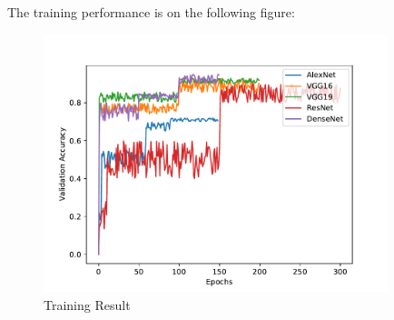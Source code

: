 \documentclass[11pt, a4paper]{article}
\begin{document}
The training performance is on the following figure:

\begin{figure}[htbp]
	\centering %
	
	\includegraphics[width=10cm]{classify}
	\caption{Training Result }
	\label{fig:brick}
\end{figure}


  
% 





\end{document}
